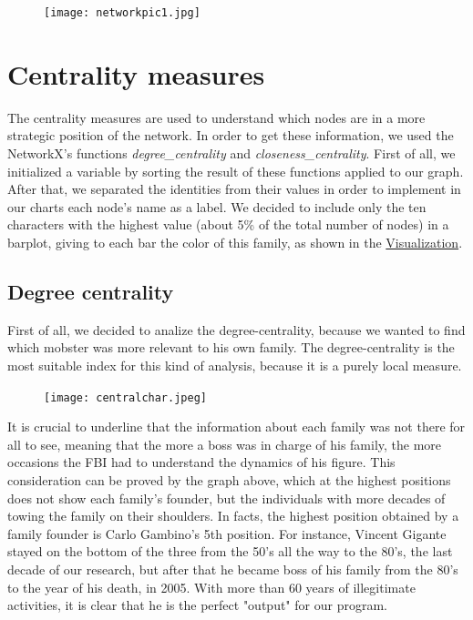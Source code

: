 \documentclass{article}
\begin{document}
\begin{figure}[t!]
\vspace{-250pt}
\centering
\texttt{[image: networkpic1.jpg]}
\advance\leftskip-3.52cm
\end{figure}



\section{\textcolor{Paragrafi}{Centrality measures}}
The centrality measures are used to understand which nodes are in a more strategic position of the network. In order to get these information, we used the NetworkX's functions \textit{degree\_centrality} and \textit{closeness\_centrality}. First of all, we initialized a variable by sorting the result of these functions applied to our graph. After that, we separated the identities from their values in order to implement in our charts each node's name as a label. We decided to include only the ten characters with the highest value (about 5\% of the total number of nodes) in a barplot, giving to each bar the color of this family, as shown in the \hyperref[sec:Visualization]{Visualization}.
\vspace{10pt}



\textcolor{Titoli}{\subsection{Degree centrality}}
First of all, we decided to analize the degree-centrality, because we wanted to find which mobster was more relevant to his own family. The degree-centrality is the most suitable index for this kind of analysis, because it is a purely local measure. \\



\begin{figure}[hbt!]
\centering
\advance\leftskip-5cm
\texttt{[image: centralchar.jpeg]}
\end{figure}



\vspace{20pt}
\noindent
It is crucial to underline that the information about each family was not there for all to see, meaning that the more a boss was in charge of his family, the more occasions the FBI had to understand the dynamics of his figure. This consideration can be proved by the graph above, which at the highest positions does not show each family's founder, but the individuals with more decades of towing the family on their shoulders. In facts, the highest position obtained by a family founder is Carlo Gambino's 5th position. For instance, Vincent Gigante stayed on the bottom of the three from the 50's all the way to the 80's, the last decade of our research, but after that he became boss of his family from the 80's to the year of his death, in 2005. With more than 60 years of illegitimate activities, it is clear that he is the perfect "output" for our program. 
\newpage
\end{document}
